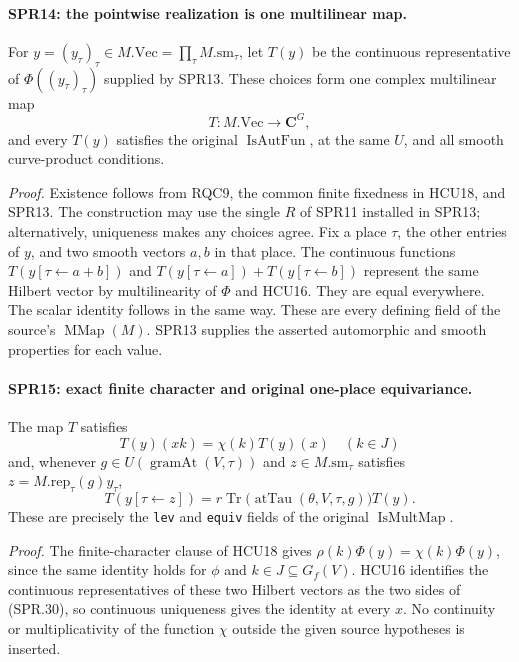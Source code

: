 \paragraph{SPR14: the pointwise realization is one multilinear map.}
\label{claim:SPR14}
For \(y=(y_\tau)_\tau\in M.\mathrm{Vec}=\prod_\tau M.\mathrm{sm}_\tau\),
let \(T(y)\) be the continuous representative of
\(\Phi((y_\tau)_\tau)\) supplied by SPR13.
These choices form one complex multilinear map
\[
                    T:M.\mathrm{Vec}\longrightarrow\mathbf C^G,
 \tag{SPR.29}
\]
and every \(T(y)\) satisfies the original
\(\operatorname{IsAutFun}\), at the same \(U\), and all smooth
curve-product conditions.

\emph{Proof.}
Existence follows from RQC9, the common finite fixedness in
HCU18, and SPR13.  The construction may use the single \(R\)
of SPR11 installed in SPR13; alternatively, uniqueness makes
any choices agree.
Fix a place \(\tau\), the other entries of \(y\), and two smooth
vectors \(a,b\) in that place.
The continuous functions
\(T(y[\tau\leftarrow a+b])\) and
\(T(y[\tau\leftarrow a])+T(y[\tau\leftarrow b])\)
represent the same Hilbert vector by multilinearity of \(\Phi\)
and HCU16.  They are equal everywhere.
The scalar identity follows in the same way.
These are every defining field of the source's
\(\operatorname{MMap}(M)\).  SPR13 supplies the asserted
automorphic and smooth properties for each value.

\paragraph{SPR15: exact finite character and original one-place equivariance.}
\label{claim:SPR15}
The map \(T\) satisfies
\[
 T(y)(xk)=\chi(k)T(y)(x)\quad(k\in J)
 \tag{SPR.30}
\]
and, whenever \(g\in U(\operatorname{gramAt}(V,\tau))\) and
\(z\in M.\mathrm{sm}_\tau\) satisfies
\(z=M.\mathrm{rep}_\tau(g)y_\tau\),
\[
             T(y[\tau\leftarrow z])
              =r\operatorname{Tr}\bigl(\operatorname{atTau}
                    (\theta,V,\tau,g)\bigr)T(y).
 \tag{SPR.31}
\]
These are precisely the \texttt{lev} and \texttt{equiv} fields
of the original \(\operatorname{IsMultMap}\).

\emph{Proof.}
The finite-character clause of HCU18 gives
\(\rho(k)\Phi(y)=\chi(k)\Phi(y)\), since the same identity holds
for \(\phi\) and \(k\in J\subseteq G_f(V)\).
HCU16 identifies the continuous representatives of these two
Hilbert vectors as the two sides of (SPR.30), so continuous
uniqueness gives the identity at every \(x\).
No continuity or multiplicativity of the function \(\chi\)
outside the given source hypotheses is inserted.

